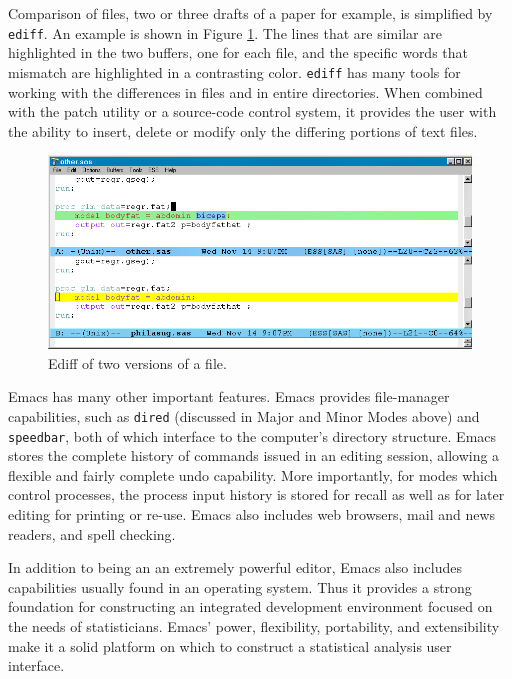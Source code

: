\documentclass{article}
\newif\ifdraft
\newcommand{\stexttt}[1]{{\small\texttt{#1}}}
\newcommand{\emptyfig}{
\hspace*{42pt}\rule{324pt}{.25pt}\\
\hspace*{42pt}\rule{.25pt}{10pc}
\rule{316pt}{.25pt}
\rule{.25pt}{10pc}}
\begin{document}
Comparison of files, two or three drafts of a paper for example, is
simplified by \stexttt{ediff}.  An example is shown in Figure
\ref{f.ediff}.  The lines that are similar are highlighted in the two
buffers, one for each file, and the specific words that mismatch are
highlighted in a contrasting color.  \stexttt{ediff} has many tools
for working with the differences in files and in entire directories.
When combined with the patch utility or a source-code control system,
it provides the user with the ability to insert, delete or modify only
the differing portions of text files.

\begin{figure}[tbp]
  \centering
  \ifdraft
     \emptyfig
  \else
     \includegraphics[angle=270,width=\textwidth]{ediff-sas}
  \fi
  \caption{Ediff of two versions of a file.}
  \label{f.ediff}
\end{figure}

Emacs has many other important features.  Emacs provides file-manager
capabilities, such as \stexttt{dired} (discussed in Major and Minor
Modes above) and \stexttt{speedbar}, both of which interface to the
computer's directory structure.  Emacs stores the complete history of
commands issued in an editing session, allowing a flexible and fairly
complete undo capability.  More importantly, for modes which control
processes, the process input history is stored for recall as well as
for later editing for printing or re-use.  Emacs also includes web
browsers, mail and news readers, and spell checking.

In addition to being an an extremely powerful editor, Emacs also
includes capabilities usually found in an operating system.  Thus it
provides a strong foundation for constructing an integrated
development environment focused on the needs of statisticians.  Emacs'
power, flexibility, portability, and extensibility make it a solid
platform on which to construct a statistical analysis user interface.
\end{document}
